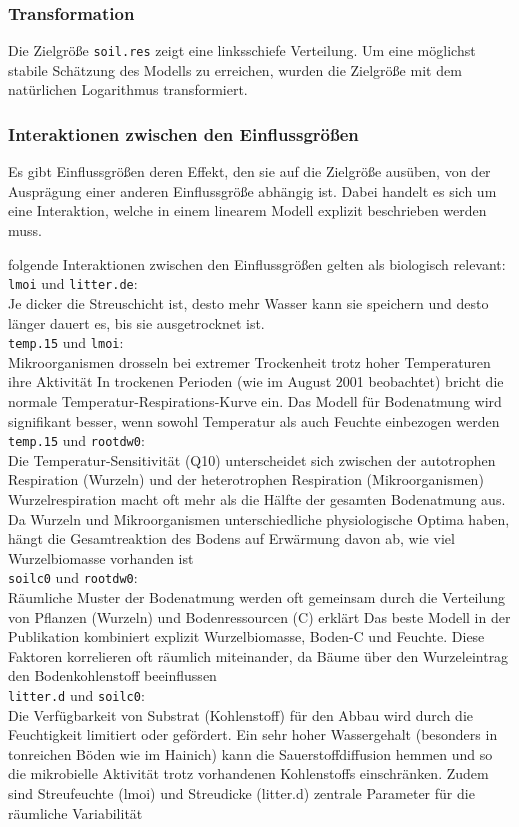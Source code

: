 \subsubsection{Transformation}
Die Zielgröße \texttt{soil.res} zeigt eine linksschiefe Verteilung. Um eine möglichst stabile Schätzung des Modells
zu erreichen, wurden die Zielgröße mit dem natürlichen Logarithmus transformiert.

\subsubsection{Interaktionen zwischen den Einflussgrößen} \label{Interaktionen}

Es gibt Einflussgrößen deren Effekt, den sie auf die Zielgröße ausüben, von der Ausprägung
einer anderen Einflussgröße abhängig ist. Dabei handelt es sich um eine Interaktion, welche in einem
linearem Modell explizit beschrieben werden muss.

folgende Interaktionen zwischen den Einflussgrößen gelten als biologisch relevant:
\\
\texttt{lmoi} und \texttt{litter.de}:\\
Je dicker die Streuschicht ist, desto mehr Wasser kann sie speichern und desto länger dauert es,
bis sie ausgetrocknet ist.
\\
\texttt{temp.15} und \texttt{lmoi}:\\
Mikroorganismen drosseln bei extremer Trockenheit trotz hoher Temperaturen ihre Aktivität
In trockenen Perioden (wie im August 2001 beobachtet) bricht die normale
Temperatur-Respirations-Kurve ein. Das Modell für Bodenatmung wird signifikant besser,
wenn sowohl Temperatur als auch Feuchte einbezogen werden
\\
\texttt{temp.15} und \texttt{rootdw0}:\\
Die Temperatur-Sensitivität (Q10) unterscheidet sich zwischen der autotrophen Respiration (Wurzeln) und der heterotrophen Respiration (Mikroorganismen)
Wurzelrespiration macht oft mehr als die Hälfte der gesamten Bodenatmung aus. Da Wurzeln und
Mikroorganismen unterschiedliche physiologische Optima haben, hängt die Gesamtreaktion des Bodens auf
Erwärmung davon ab, wie viel Wurzelbiomasse vorhanden ist
\\
\texttt{soilc0} und \texttt{rootdw0}:\\
Räumliche Muster der Bodenatmung werden oft gemeinsam durch die Verteilung von Pflanzen (Wurzeln) und Bodenressourcen (C) erklärt
Das beste Modell in der Publikation kombiniert explizit Wurzelbiomasse, Boden-C und Feuchte.
Diese Faktoren korrelieren oft räumlich miteinander, da Bäume über den Wurzeleintrag den Bodenkohlenstoff beeinflussen
\\
\texttt{litter.d} und \texttt{soilc0}:\\
Die Verfügbarkeit von Substrat (Kohlenstoff) für den Abbau wird durch die Feuchtigkeit limitiert oder gefördert.
Ein sehr hoher Wassergehalt (besonders in tonreichen Böden wie im Hainich) kann die
Sauerstoffdiffusion hemmen und so die mikrobielle Aktivität trotz vorhandenen Kohlenstoffs
einschränken. Zudem sind Streufeuchte (lmoi) und Streudicke (litter.d) zentrale Parameter für die
räumliche Variabilität


